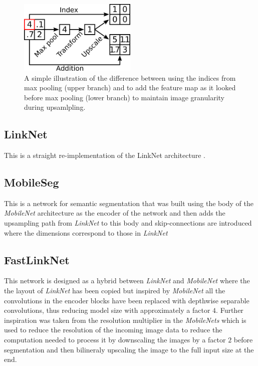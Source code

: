 \documentclass{kththesis}
\begin{document}
\begin{figure}[h]
  \centering
  \includegraphics[width=0.5\textwidth]{upscale}
  \caption{A simple illustration of the difference between using the indices
    from max pooling (upper branch) and to add the feature map as it looked
    before max pooling (lower branch)
    to maintain image granularity during upsamlpling.}
  \label{fig:upscale}
\end{figure}

\subsection*{LinkNet}
This is a straight re-implementation of the LinkNet architecture \parencite{chaurasia2017linknet}.

\subsection*{MobileSeg}
This is a network for semantic segmentation that was built using the body of the
\textit{MobileNet} architecture \parencite{howard2017mobilenets} as the encoder of the network and then adds the
upsampling path from \textit{LinkNet} to this body and skip-connections are
introduced where the dimensions correspond to those in \textit{LinkNet}

\subsection*{FastLinkNet}
This network is designed as a hybrid between \textit{LinkNet} and
\textit{MobileNet} where the the layout of \textit{LinkNet} has been copied but
inspired by \textit{MobileNet} all the convolutions in the encoder blocks have
been replaced with depthwise separable convolutions, thus reducing model size
with approximately a factor \(4\).
Further inspiration was taken from the resolution
multiplier in the \textit{MobileNets} which is used to reduce the resolution of
the incoming image data to reduce the computation needed to process it by
downscaling the images by a factor \(2\) before segmentation and then bilineraly
upscaling the image to the full input size at the end.
\end{document}
